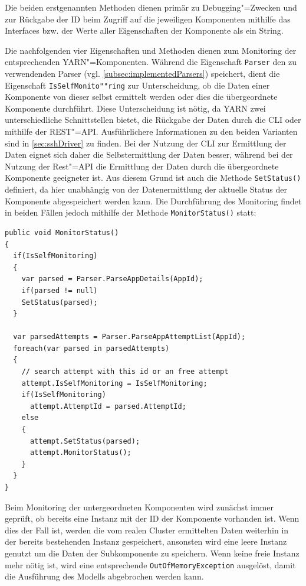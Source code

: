 Die beiden erstgenannten Methoden dienen primär zu Debugging"=Zwecken und zur Rückgabe der ID beim Zugriff auf die jeweiligen Komponenten mithilfe das Interfaces bzw. der Werte aller Eigenschaften der Komponente als ein String.

Die nachfolgenden vier Eigenschaften und Methoden dienen zum Monitoring der entsprechenden \ac{YARN}"=Komponenten.
Während die Eigenschaft \texttt{Parser} den zu verwendenden Parser (vgl. \cref{subsec:implementedParsers}) speichert, dient die Eigenschaft \texttt{IsSelfMonito""ring} zur Unterscheidung, ob die Daten einer Komponente von dieser selbst ermittelt werden oder dies die übergeordnete Komponente durchführt.
Diese Unterscheidung ist nötig, da \ac{YARN} zwei unterschiedliche Schnittstellen bietet, die Rückgabe der Daten durch die \ac{CLI} oder mithilfe der REST"=API.
Ausführlichere Informationen zu den beiden Varianten sind in \cref{sec:sshDriver} zu finden.
Bei der Nutzung der \ac{CLI} zur Ermittlung der Daten eignet sich daher die Selbstermittlung der Daten besser, während bei der Nutzung der Rest"=API die Ermittlung der Daten durch die übergeordnete Komponente geeigneter ist.
Aus diesem Grund ist auch die Methode \texttt{SetStatus()} definiert, da hier unabhängig von der Datenermittlung der aktuelle Status der Komponente abgespeichert werden kann.
Die Durchführung des Monitoring findet in beiden Fällen jedoch mithilfe der Methode \texttt{MonitorStatus()} statt:

\begin{lstlisting}[label=lst:monitorAppStatus,style=cs,
caption={[Implementierung der Methode MonitorStatus() in der Klasse YarnApp]
    Implementierung der Methode \texttt{MonitorStatus()} in der Klasse \texttt{YarnApp} (gekürzt).
    Das Monitoring der anderen Komponenten erfolgt analog hierzu.}]
public void MonitorStatus()
{
  if(IsSelfMonitoring)
  {
    var parsed = Parser.ParseAppDetails(AppId);
    if(parsed != null)
    SetStatus(parsed);
  }
  
  var parsedAttempts = Parser.ParseAppAttemptList(AppId);
  foreach(var parsed in parsedAttempts)
  {
    // search attempt with this id or an free attempt
    attempt.IsSelfMonitoring = IsSelfMonitoring;
    if(IsSelfMonitoring)
      attempt.AttemptId = parsed.AttemptId;
    else
    {
      attempt.SetStatus(parsed);
      attempt.MonitorStatus();
    }
  }
}
\end{lstlisting}

Beim Monitoring der untergeordneten Komponenten wird zunächst immer geprüft, ob bereits eine Instanz mit der ID der Komponente vorhanden ist.
Wenn dies der Fall ist, werden die vom realen Cluster ermittelten Daten weiterhin in der bereits bestehenden Instanz gespeichert, ansonsten wird eine leere Instanz genutzt um die Daten der Subkomponente zu speichern.
Wenn keine freie Instanz mehr nötig ist, wird eine entsprechende \texttt{OutOfMemoryException} ausgelöst, damit die Ausführung des Modells abgebrochen werden kann.

